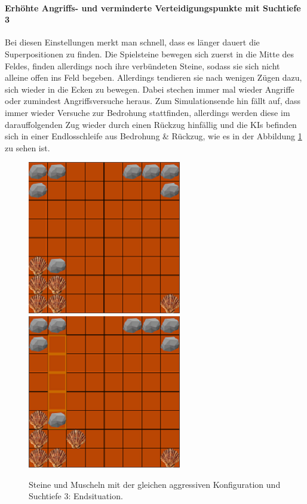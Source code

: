 \paragraph{Erhöhte Angriffs- und verminderte Verteidigungspunkte mit Suchtiefe 3}
Bei diesen Einstellungen merkt man schnell, dass es länger dauert die Superpositionen zu finden. Die Spielsteine bewegen sich zuerst in die Mitte des Feldes, finden allerdings noch ihre verbündeten Steine, sodass sie sich nicht alleine offen ins Feld begeben. Allerdings tendieren sie nach wenigen Zügen dazu, sich wieder in die Ecken zu bewegen. Dabei stechen immer mal wieder Angriffe oder zumindest Angriffsversuche heraus. Zum Simulationsende hin fällt auf, dass immer wieder Versuche zur Bedrohung stattfinden, allerdings werden diese im darauffolgenden Zug wieder durch einen Rückzug hinfällig und die KIs befinden sich in einer Endlosschleife aus Bedrohung \& Rückzug, wie es in der Abbildung \ref{fig:aggro3} zu sehen ist.
\begin{figure}[h]
	\centering
	\includegraphics{img/Aggro/tiefe3Bedrohung2}
	\includegraphics{img/Aggro/tiefe3rueckzug2}
	\caption{Steine und Muscheln mit der gleichen aggressiven Konfiguration und Suchtiefe 3: Endsituation.}
	\label{fig:aggro3}
\end{figure}

